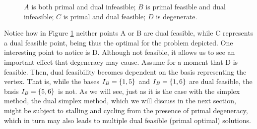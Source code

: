 \begin{figure}
	\caption{$A$ is both primal and dual infeasible; $B$ is primal feasible and dual infeasible; $C$ is primal and dual feasible; $D$ is degenerate.} \label{p1c5:fig:dual_feasibility}
\end{figure}

Notice how in Figure \ref{p1c5:fig:dual_feasibility} neither points A or B are dual feasible, while C represents a dual feasible point, being thus the optimal for the problem depicted. One interesting point to notice is D. Although not feasible, it allows us to see an important effect that degeneracy may cause. Assume for a moment that D is feasible. Then, dual feasibility becomes dependent on the basis representing the vertex. That is,  while the bases $I_B = \left\{ 1,5 \right \}$ and $I_B = \left\{ 1,6 \right \}$ are dual feasible, the basis $I_B = \left\{ 5,6 \right \}$ is not. As we will see, just as it is the case with the simplex method, the dual simplex method, which we will discuss in the next section, might be subject to stalling and cycling from the presence of primal degeneracy, which in turn may also leads to multiple dual feasible (primal optimal) solutions.
 

